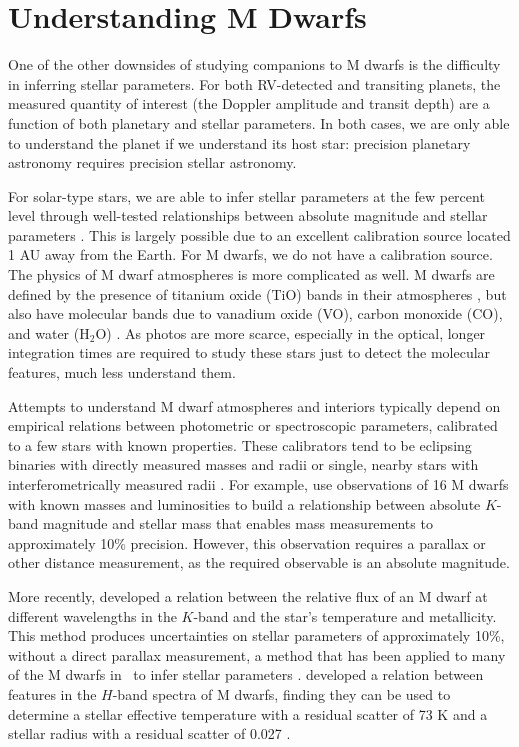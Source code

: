 \section{Understanding M Dwarfs}
One of the other downsides of studying companions to M dwarfs is the difficulty 
in inferring stellar parameters.
For both RV-detected and transiting planets, the measured quantity of interest 
(the Doppler amplitude and transit depth) are a function of both planetary and stellar
parameters. 
In both cases, we are only able to understand the planet if we understand its host star:
precision planetary astronomy requires precision stellar astronomy.

For solar-type stars, we are able to infer stellar parameters at the few percent level
through well-tested relationships between absolute magnitude and stellar parameters
\citep{Andersen91, Casagrande10}.
This is largely possible due to an excellent calibration source located 1 AU away from the 
Earth.
For M dwarfs, we do not have a calibration source.
The physics of M dwarf atmospheres is more complicated as well.
M dwarfs are defined by the presence of titanium oxide (TiO) bands in their
atmospheres \citep{Kuiper38, Morgan38}, but also have molecular bands due to
vanadium oxide (VO), carbon monoxide (CO), and water (H$_2$O) \citep[e.g.][]{Mould75, Muirhead12b}.
As photos are more scarce, especially in the optical, longer integration times are 
required to study these stars just to detect the molecular features, much less
understand them.


Attempts to understand M dwarf atmospheres and interiors typically depend on empirical 
relations between photometric or spectroscopic parameters, calibrated to a few stars
with known properties.
These calibrators tend to be eclipsing binaries with directly measured masses and radii 
\citet{Birkby12} or single, nearby stars with interferometrically measured radii \citep{Boyajian12}.
For example, \citet{Delfosse00} use observations of 16 M dwarfs with known masses and
luminosities to build a relationship between absolute $K$-band magnitude and stellar mass
that enables mass measurements to approximately 10\% precision.
However, this observation requires a parallax or other distance measurement, as the
required observable is an absolute magnitude.

More recently, \citet{RojasAyala12} developed a relation between the relative flux
of an M dwarf at different wavelengths in the $K$-band and the star's temperature
and metallicity.
This method produces uncertainties on stellar parameters of approximately 10\%, without
a direct parallax measurement, a method that has been applied to many of the M dwarfs
in \kep\ to infer stellar parameters \citep{Muirhead12b, Muirhead14}.
\citet{Newton15} developed a relation between features in the $H$-band spectra of M dwarfs,
finding they can be used to determine a stellar effective temperature with a residual
scatter of 73 K and a stellar radius with a residual scatter of 0.027 \rsun.



